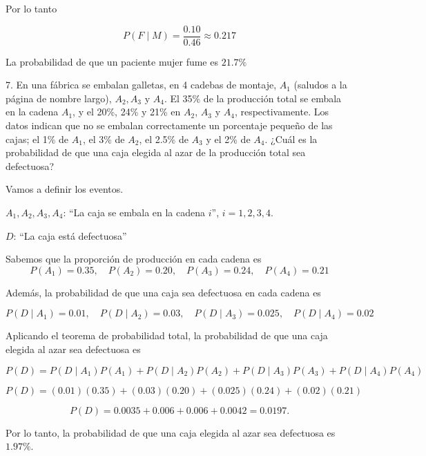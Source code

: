 Por lo tanto
\vspace{0.2cm}

$$P(F \mid M) = \frac{0.10}{0.46} \approx 0.217$$

La probabilidad de que un paciente mujer fume es $\boxed{21.7\%}$

\QED

\vspace{0.8cm}

7. En una fábrica se embalan galletas, en 4 cadebas de montaje, $A_1$ 
(saludos a la página de nombre largo), $A_2, A_3 \text{ y } A_4$. 
El 35\% de la producción total se embala en la cadena $A_1$, 
y el 20\%, 24\% y 21\% en $A_2$, $A_3$ y $A_4$, respectivamente. 
Los datos indican que no se embalan correctamente un porcentaje 
pequeño de las cajas; el 1\% de $A_1$, el 3\% de $A_2$, el 2.5\% de $A_3$ 
y el 2\% de $A_4$. ¿Cuál es la probabilidad de que una caja elegida al azar 
de la producción total sea defectuosa?

\vspace{0.5cm}

Vamos a definir los eventos.

$A_1, A_2, A_3, A_4$: ``La caja se embala en la cadena $i$'', $i=1,2,3,4$.

$D$: ``La caja está defectuosa''

\vspace{0.4cm}

Sabemos que la proporción de producción en cada cadena es
$$P(A_1)=0.35,\quad P(A_2)=0.20,\quad P(A_3)=0.24,\quad P(A_4)=0.21$$

\vspace{0.2cm}

Además, la probabilidad de que una caja sea defectuosa en cada cadena es

$$P(D\mid A_1)=0.01,\quad P(D\mid A_2)=0.03,\quad P(D\mid A_3)=0.025,\quad P(D\mid A_4)=0.02$$

\vspace{0.2cm}

Aplicando el teorema de probabilidad total, la probabilidad de que una caja elegida al azar sea defectuosa es

$$P(D)=P(D\mid A_1)P(A_1)+P(D\mid A_2)P(A_2)+P(D\mid A_3)P(A_3)+P(D\mid A_4)P(A_4)$$

$$P(D) = (0.01)(0.35) + (0.03)(0.20) + (0.025)(0.24) + (0.02)(0.21)$$

$$P(D) = 0.0035 + 0.006 + 0.006 + 0.0042 = 0.0197.$$

\vspace{0.2cm}

Por lo tanto, la probabilidad de que una caja elegida al azar sea defectuosa es $\boxed{1.97\%}$.

\QED

\vspace{0.8cm}
